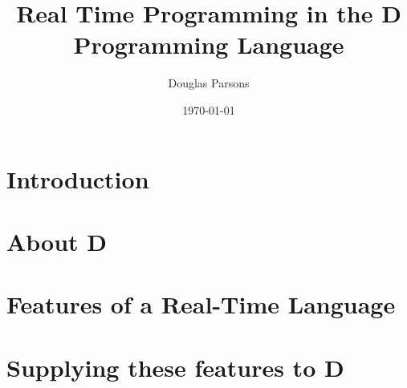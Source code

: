 \documentclass[a4paper, 11pt]{article}
\title{Real Time Programming in the D Programming Language}
\author{Douglas Parsons}
\date{\today}
\begin{document}
\maketitle
%
\section{Introduction}

\section{About D}

\section{Features of a Real-Time Language}

\section{Supplying these features to D}

%
%
%
\end{document}
